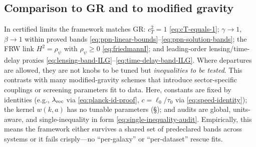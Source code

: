 \documentclass[12pt,a4paper]{article}
\begin{document}
\subsection{Comparison to GR and to modified gravity}
In certified limits the framework matches GR: \(c_T^2=1\) \eqref{eq:cT-equals-1}; \(\gamma\to1\), \(\beta\to1\) within proved bands \eqref{eq:ppn-linear-bounds}–\eqref{eq:ppn-solution-bands}; the FRW link \(H^2=\rho_\psi\) with \(\rho_\psi\ge 0\) \eqref{eq:friedmannI}; and leading-order lensing/time-delay proxies \eqref{eq:lensing-band-ILG}–\eqref{eq:time-delay-band-ILG}. Where departures are allowed, they are not knobs to be tuned but \emph{inequalities to be tested}. This contrasts with many modified-gravity schemes that introduce sector-specific couplings or screening parameters fit to data. Here, constants are fixed by identities (e.g., \(\lambda_{\rm rec}\) via \eqref{eq:planck-id-proof}, \(c=\ell_0/\tau_0\) via \eqref{eq:speed-identity}); the kernel \(w(k,a)\) has no tunable parameters (\S{}); and audits are global, units-aware, and single-inequality in form \eqref{eq:single-inequality-audit}. Empirically, this means the framework either survives a shared set of predeclared bands across systems or it fails crisply—no “per-galaxy” or “per-dataset” rescue fits.
\end{document}
